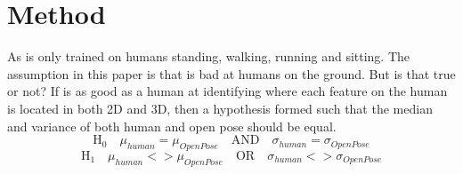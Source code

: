 \section{Method}
\label{sec:method}
As \openpose{ } is only trained on humans standing, walking, running and sitting.
The assumption in this paper is that \openpose{ } is bad at humans on the ground.
But is that true or not?
If \openpose{ } is as good as a human at identifying where each feature on the human is located in both 2D and 3D, then a hypothesis formed such that the median and variance of both human and open pose should be equal.
$$
\text{H}_0\quad \mu_{human} = \mu_{OpenPose} \quad\text{AND}\quad \sigma_{human} = \sigma_{OpenPose}
$$
$$
\text{H}_1\quad \mu_{human} <> \mu_{OpenPose} \quad\text{OR}\quad \sigma_{human} <> \sigma_{OpenPose}
$$









